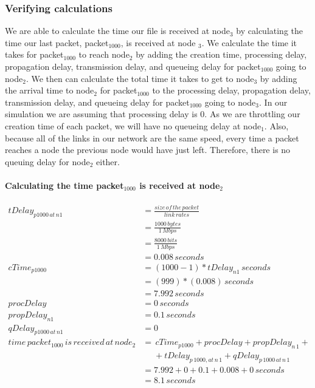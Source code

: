 \documentclass[fleqn,11pt]{article}
\begin{document}
\subsubsection{Verifying calculations}
We are able to calculate the time our file is received at node$_3$ by calculating the time our last packet, packet$_{1000}$, is received at node $_3$. We calculate the time it takes for packet$_{1000}$ to reach node$_2$ by adding the creation time, processing delay, propagation delay, transmission delay, and queueing delay for packet$_{1000}$ going to node$_2$. We then can calculate the total time it takes to get to node$_3$ by adding the arrival time to node$_2$ for packet$_{1000}$ to the processing delay, propagation delay, transmission delay, and queueing delay for packet$_{1000}$ going to node$_3$. In our simulation we are assuming that processing delay is 0. As we are throttling our creation time of each packet, we will have no queueing delay at node$_1$. Also, because all of the links in our network are the same speed, every time a packet reaches a node the previous node would have just left. Therefore, there is no queuing delay for node$_2$  either.

\paragraph{Calculating the time packet$_{1000}$ is received at node$_2$ }
\begin{align*}
tDelay_{p1000\,at\,n1} &=  \frac{size\,of\,the\,packet} {link\,rates}\\
&= \frac{1000\,bytes} {1\,Mbps}\\
&=  \frac{8000\,bits} {1\,Mbps}\\
&= 0.008 \,seconds\\
cTime_{p1000} &= (1000-1) *tDelay_{n1}\,seconds\\
&= (999) *(0.008)\,seconds\\
&= 7.992\,seconds\\
procDelay &= 0\,seconds\\
propDelay_{n1} &= 0.1\,seconds\\
qDelay_{p1000\,at\,n1} &= 0\\
time\,packet_{1000}\,is\,received\,at\,node_{2} &= \,cTime_{p1000} + procDelay + propDelay_{n\,1} +\\
&\,\,\,\,\,\,\,\, + tDelay_{p\,1000,at\,n\,1} + qDelay_{p\,1000\,at\,n\,1}\\
&= 7.992 + 0 + 0.1 + 0.008 + 0\,seconds\\
&= 8.1\,seconds
\end{align*}
\end{document}
